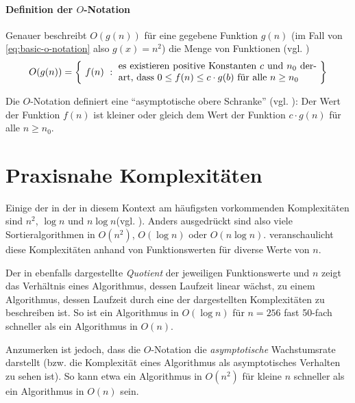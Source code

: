 \paragraph{Definition der $O$-Notation}

Genauer beschreibt $O(g(n))$ für eine gegebene Funktion $g(n)$ (im Fall von \eqref{eq:basic-o-notation} also $g(x) = n^2$) die Menge von Funktionen (vgl. \cite[37]{meh1984})
%
\begin{equation*}
    O(g(n))=\left\{\ 
        f(n)\ :\ \parbox{.6\textwidth}{
            es existieren positive Konstanten $c$ und $n_0$ derart, dass $0 \leq f(n) \leq c \cdot g(b)$ für alle $n \geq n_0$
        }
    \ \right\}
\end{equation*}

Die $O$-Notation definiert eine \enquote{asymptotische obere Schranke} (vgl. \cite[64]{sha2011}): Der Wert der Funktion $f(n)$ ist kleiner oder gleich dem Wert der Funktion $c \cdot g(n)$ für alle $n \geq n_0$.

\section{Praxisnahe Komplexitäten}
\label{sec:praxisnahe-komplexitäten}

Einige der in der in diesem Kontext am häufigsten vorkommenden Komplexitäten sind $n^2$, $\log n$ und $n \log n$\footnotemark (vgl. \cite[38]{hsr1997}). Anders ausgedrückt sind also viele Sortieralgorithmen in $O(n^2)$, $O(\log n)$ oder $O(n \log n)$.  veranschaulicht diese Komplexitäten anhand von Funktionswerten für diverse Werte von $n$.


Der in  ebenfalls dargestellte \emph{Quotient} der jeweiligen Funktionswerte und $n$ zeigt das Verhältnis eines Algorithmus, dessen Laufzeit linear wächst, zu einem Algorithmus, dessen Laufzeit durch eine der dargestellten Komplexitäten zu beschreiben ist. So ist ein Algorithmus in $O(\log n)$ für $n = 256$ fast 50-fach schneller als ein Algorithmus in $O(n)$.

Anzumerken ist jedoch, dass die $O$-Notation die \emph{asymptotische} Wachstumsrate darstellt (bzw. die Komplexität eines Algorithmus als asymptotisches Verhalten zu sehen ist). So kann etwa ein Algorithmus in $O(n^2)$ für kleine $n$ schneller als ein Algorithmus in $O(n)$ sein.

